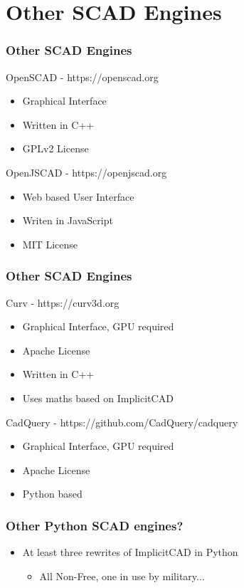 \documentclass{beamer}
\begin{document}
\section{Other SCAD Engines}
\begin{frame}
\frametitle{Other SCAD Engines}
\begin{block}{OpenSCAD - https://openscad.org}
\begin{itemize}
\item Graphical Interface
\item Written in C++
\item GPLv2 License
\end{itemize}
\end{block}
\begin{block}{OpenJSCAD - https://openjscad.org}
\begin{itemize}
\item Web based User Interface
\item Writen in JavaScript
\item MIT License
\end{itemize}
\end{block}
\end{frame}

\begin{frame}
\frametitle{Other SCAD Engines}
\begin{block}{Curv - https://curv3d.org}
\begin{itemize}
\item Graphical Interface, GPU required
\item Apache License
\item Written in C++
\item Uses maths based on ImplicitCAD
\end{itemize}
\end{block}
\begin{block}{CadQuery - https://github.com/CadQuery/cadquery}
\begin{itemize}
\item Graphical Interface, GPU required
\item Apache License
\item Python based
\end{itemize}
\end{block}
\end{frame}

\begin{frame}
\frametitle{Other Python SCAD engines?}
\begin{itemize}
\item At least three rewrites of ImplicitCAD in Python
\begin{itemize}
\item All Non-Free, one in use by military...
\end{itemize}
\end{itemize}
\end{frame}
\end{document}
